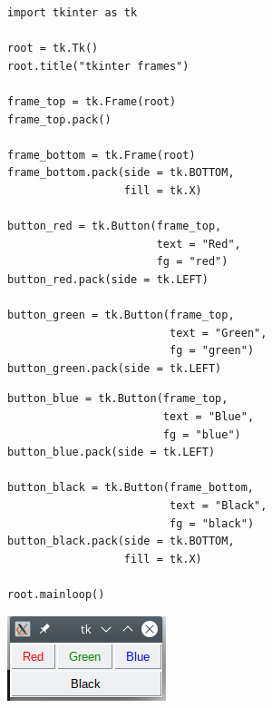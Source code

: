 \begin{frame}[fragile]
%
\begin{minipage}{.49\linewidth}
\begin{codebox}
\begin{verbatim}
import tkinter as tk

root = tk.Tk()
root.title("tkinter frames")

frame_top = tk.Frame(root)
frame_top.pack()

frame_bottom = tk.Frame(root)
frame_bottom.pack(side = tk.BOTTOM,
                  fill = tk.X)

button_red = tk.Button(frame_top,
                       text = "Red",
                       fg = "red")
button_red.pack(side = tk.LEFT)

button_green = tk.Button(frame_top,
                         text = "Green",
                         fg = "green")
button_green.pack(side = tk.LEFT)
\end{verbatim}
\end{codebox}
\end{minipage}
%
\begin{minipage}{.49\linewidth}
\begin{codebox}[... Continued]
\begin{verbatim}
button_blue = tk.Button(frame_top,
                        text = "Blue",
                        fg = "blue")
button_blue.pack(side = tk.LEFT)

button_black = tk.Button(frame_bottom,
                         text = "Black",
                         fg = "black")
button_black.pack(side = tk.BOTTOM,
                  fill = tk.X)

root.mainloop()
\end{verbatim}
\end{codebox}
\begin{tcolorbox}[title=Output: Buttons and Frames]
\begin{center}
\includegraphics[width=.49\linewidth]{./gfx/12-tk-buttonsframe}
\end{center}
\end{tcolorbox}
\end{minipage}
%
\end{frame}

